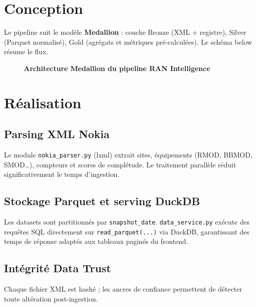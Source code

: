 \documentclass[12pt,a4paper]{report}
\begin{document}
\section{Conception}\label{sec:ch4-conception}
Le pipeline suit le modèle \textbf{Medallion} : couche Bronze (XML + registre), Silver (Parquet normalisé), Gold (agrégats et métriques pré-calculées). Le schéma below résume le flux.

\begin{figure}[H]\centering
{}
\caption{\textbf{Architecture Medallion du pipeline RAN Intelligence}}
\label{fig:medallion}
\end{figure}

\section{Réalisation}\label{sec:ch4-realisation}

\subsection{Parsing XML Nokia}
Le module \texttt{nokia\_parser.py} (lxml) extrait sites, équipements (RMOD, BBMOD, SMOD…), compteurs et scores de complétude. Le traitement parallèle réduit significativement le temps d'ingestion.

\subsection{Stockage Parquet et serving DuckDB}
Les datasets sont partitionnés par \texttt{snapshot\_date}. \texttt{data\_service.py} exécute des requêtes SQL directement sur \texttt{read\_parquet(...)} via DuckDB, garantissant des temps de réponse adaptés aux tableaux paginés du frontend.

\subsection{Intégrité Data Trust}
Chaque fichier XML est hashé ; les ancres de confiance permettent de détecter toute altération post-ingestion.
\end{document}
